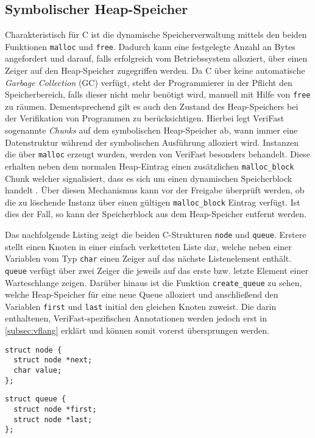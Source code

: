 \subsection{Symbolischer Heap-Speicher}
\label{subsuc:malloc}

Charakteristisch für C ist die dynamische Speicherverwaltung mittels den beiden Funktionen \texttt{malloc} und \texttt{free}. Dadurch kann eine festgelegte Anzahl an Bytes angefordert und darauf, falls erfolgreich vom Betriebssystem alloziert, über einen Zeiger auf den Heap-Speicher zugegriffen werden. Da C über keine automatische \emph{Garbage Collection} (GC) verfügt, steht der Programmierer in der Pflicht den Speicherbereich, falls dieser nicht mehr benötigt wird, manuell mit Hilfe von \texttt{free} zu räumen. Dementsprechend gilt es auch den Zustand des Heap-Speichers bei der Verifikation von Programmen zu berücksichtigen. Hierbei legt VeriFast sogenannte \emph{Chunks} auf dem symbolischen Heap-Speicher ab, wann immer eine Datenstruktur während der symbolischen Ausführung alloziert wird. Instanzen die über \texttt{malloc} erzeugt wurden, werden von VeriFast besonders behandelt. Diese erhalten neben dem normalen Heap-Eintrag einen zusätzlichen \texttt{malloc\_block} Chunk welcher signalisiert, dass es sich um einen dynamischen Speicherblock handelt \cite{Jacobs2008,Jacobs2010}. Über diesen Mechanismus kann vor der Freigabe überprüft werden, ob die zu löschende Instanz über einen gültigen \texttt{malloc\_block} Eintrag verfügt. Ist dies der Fall, so kann der Speicherblock aus dem Heap-Speicher entfernt werden.

Das nachfolgende Listing zeigt die beiden C-Strukturen \texttt{node} und \texttt{queue}. Erstere stellt einen Knoten in einer einfach verketteten Liste dar, welche neben einer Variablen vom Typ \texttt{char} einen Zeiger auf das nächste Listenelement enthält. \texttt{queue} verfügt über zwei Zeiger die jeweils auf das erste bzw. letzte Element einer Warteschlange zeigen. Darüber hinaus ist die Funktion \texttt{create\_queue} zu sehen, welche Heap-Speicher für eine neue Queue alloziert und anschließend den Variablen \texttt{first} und \texttt{last} initial den gleichen Knoten zuweist. Die darin enthaltenen, VeriFast-spezifischen Annotationen werden jedoch erst in \cref{subsec:vflang} erklärt und können somit vorerst übersprungen werden.

\vspace{-10pt}
{\noindent
\begin{minipage}[t]{.45\textwidth}
\begin{lstlisting}
struct node {
  struct node *next;
  char value;
};
\end{lstlisting}
\end{minipage}
\hfill
\begin{minipage}[t]{.45\textwidth}
\begin{lstlisting}
struct queue {
  struct node *first;
  struct node *last;
};
\end{lstlisting}
\end{minipage}
}

